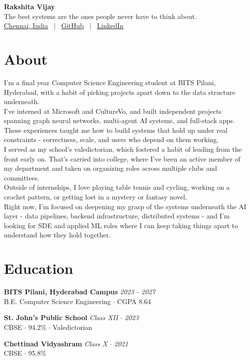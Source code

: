 \documentclass[10pt,letterpaper]{article}
\newcommand{\head}[2]{{\bfseries #1} \hfill {\itshape #2}\\}
\begin{document}
\begin{center}
{\LARGE \bfseries Rakshita Vijay}\\[2pt]
{\small The best systems are the ones people never have to think about.}\\[2pt]
{\small \href{mailto:Chennai, India}{Chennai, India} ~$\vert$~ \href{https://github.com/rakshita-vijay}{GitHub} ~$\vert$~ \href{https://www.linkedin.com/in/rakshita-vijay/}{LinkedIn}}
\end{center}
\vspace{-4pt}
\section*{About}
I'm a final year Computer Science Engineering student at BITS Pilani, Hyderabad, with a habit of picking projects apart down to the data structure underneath.\\[3pt]
I've interned at Microsoft and CultureVo, and built independent projects spanning graph neural networks, multi-agent AI systems, and full-stack apps. These experiences taught me how to build systems that hold up under real constraints - correctness, scale, and users who depend on them working.\\[3pt]
I served as my school's valedictorian, which fostered a habit of leading from the front early on. That's carried into college, where I've been an active member of my department and taken on organizing roles across multiple clubs and committees.\\[3pt]
Outside of internships, I love playing table tennis and cycling, working on a crochet pattern, or getting lost in a mystery or fantasy novel.\\[3pt]
Right now, I'm focused on deepening my grasp of the systems underneath the AI layer - data pipelines, backend infrastructure, distributed systems - and I'm looking for SDE and applied ML roles where I can keep taking things apart to understand how they hold together.\\
\par\vspace{-5pt}
\section*{Education}
\head{BITS Pilani, Hyderabad Campus}{2023 - 2027}
B.E. Computer Science Engineering $\cdot$ CGPA 8.64\\[2pt]
\par\vspace{-5pt}
\head{St. John's Public School}{Class XII $\cdot$ 2023}
CBSE $\cdot$ 94.2\% $\cdot$ Valedictorian\\[2pt]
\par\vspace{-5pt}
\head{Chettinad Vidyashram}{Class X $\cdot$ 2021}
CBSE $\cdot$ 95.8\%\\[2pt]
\par\vspace{-5pt}
\end{document}
